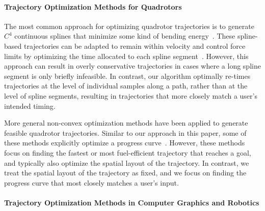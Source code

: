 \paragraph{Trajectory Optimization Methods for Quadrotors}


The most common approach for optimizing quadrotor trajectories is to generate $C^4$ continuous splines that minimize some kind of bending energy~\cite{mellinger:2011,bry:2015,deits:2015,joubert:2015}.
These spline-based trajectories can be adapted to remain within velocity and control force limits by optimizing the time allocated to each spline segment~\cite{mellinger:2011,bry:2015}.
However, this approach can result in overly conservative trajectories in cases where a long spline segment is only briefly infeasible.
In contrast, our algorithm optimally re-times trajectories at the level of individual samples along a path, rather than at the level of spline segments, resulting in trajectories that more closely match a user's intended timing.

More general non-convex optimization methods have been applied to generate feasible quadrotor trajectories.
Similar to our approach in this paper, some of these methods explicitly optimize a progress curve~\cite{cowling:2007,bouktir:2008,vanloock:2013}.
However, these methods focus on finding the fastest or most fuel-efficient trajectory that reaches a goal, and typically also optimize the spatial layout of the trajectory.
In contrast, we treat the spatial layout of the trajectory as fixed, and we focus on finding the progress curve that most closely matches a user's input.

\paragraph{Trajectory Optimization Methods in Computer Graphics and Robotics}

